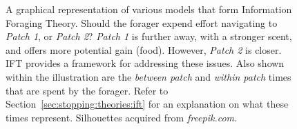 \begin{figure}[t!]
    \centering
    \caption[Illustration of the Patch Model]{A graphical representation of various models that form Information Foraging Theory. Should the forager expend effort navigating to \emph{Patch 1}, or \emph{Patch 2}? \emph{Patch 1} is further away, with a stronger scent, and offers more potential gain (food). However, \emph{Patch 2} is closer. IFT provides a framework for addressing these issues. Also shown within the illustration are the \emph{between patch} and \emph{within patch} times that are spent by the forager. Refer to Section~\ref{sec:stopping:theories:ift} for an explanation on what these times represent. Silhouettes acquired from \emph{freepik.com}.}
    \label{fig:ch3-patch}
\end{figure}

